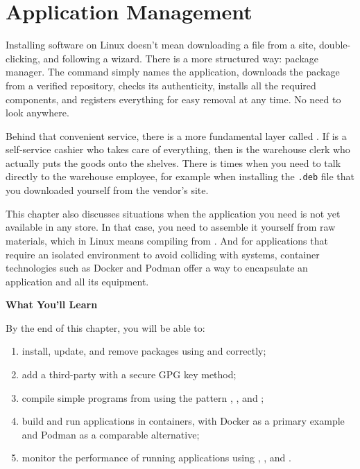 
\chapter{Application Management}
\label{ch:application-management}


Installing software on Linux doesn't mean downloading a file from a site, double-clicking, and following a wizard. There is a more structured way: package manager. The  command simply names the application, downloads the package from a verified repository, checks its authenticity, installs all the required components, and registers everything for easy removal at any time. No need to look anywhere.

Behind that convenient  service, there is a more fundamental layer called
. If  is a self-service cashier who takes care of everything, then
 is the warehouse clerk who actually puts the goods onto the shelves. There is
times when you need to talk directly to the warehouse employee, for example when installing the \texttt{.deb} file that you downloaded yourself from the vendor's site.

This chapter also discusses situations when the application you need is not yet available in any store. In that case, you need to assemble it yourself from raw materials, which in Linux means compiling from . And for applications that require an isolated environment to avoid colliding with systems, container technologies such as Docker and Podman offer a way to encapsulate an application and all its equipment.

\textbf{What You'll Learn}

By the end of this chapter, you will be able to:

\begin{enumerate}
\item install, update, and remove packages using  and
 correctly;
\item add a third-party  with a secure GPG key method;
\item compile simple programs from  using the pattern
, , and ;
\item build and run applications in containers, with Docker
as a primary example and Podman as a comparable alternative;
\item monitor the performance of running applications using ,
, and .
\end{enumerate}


